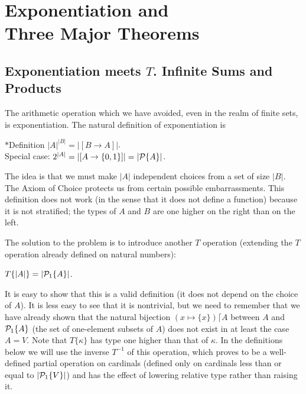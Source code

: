 \chapter[Three Theorems]{Exponentiation and\\ Three Major Theorems}

\section[Exponentiation meets $T$]{Exponentiation meets
$T$. Infinite Sums and
Products}

The arithmetic operation which we have avoided, even in the
realm of finite sets, is
exponentiation.  The natural definition
of exponentiation is

\begin{ThmEtc}{$*$Definition}
 $|A|^{|B|} = |[B \rightarrow  A]|$.\\
 Special case:  $2^{|A|} = 
 |[A \rightarrow  \{0,1\}]| = |{\cal P}\{A\}|$.
\end{ThmEtc}

The idea is that we must make $|A|$ independent choices from a
set of size $|B|$.  The Axiom of Choice protects us from certain
possible embarrassments.  This definition does not work
(in the sense that it does not define a function) because it is
not stratified; the types of $A$
and $B$ are one higher on the right than on the left.

The solution to the problem is to introduce another $T$
operation (extending the $T$ operation already defined on natural numbers):

\begin{definition}
 $T\{|A|\} = |{\cal P}_1\{A\}|$.
\end{definition}

It is easy to show that this is a valid definition (it does not depend
on the choice of $A$).  It is less easy to see that it is nontrivial,
but we need to remember that we have already shown that the natural
bijection\linebreak
$(x \mapsto \{x\}) \lceil A$ between $A$ and ${\cal
P}_1\{A\}$ (the set of one-element subsets of $A$) does not exist in
at least the case $A = V$.  Note that $T\{\kappa\}$ has type one higher than that of $\kappa$.  In the definitions below we will
use the inverse $T^{-1}$ of this operation, which proves to be a
well-defined partial operation on cardinals (defined
only on cardinals less than or equal to $|{\cal P}_1\{V\}|$) and has the effect
of lowering relative type rather than raising it.

